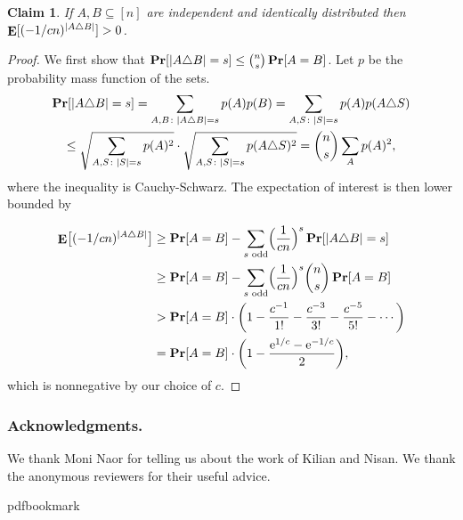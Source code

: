\documentclass[11pt]{article}
\numberwithin{equation}{section}
\newtheorem{claim}[theorem]{Claim}
\theoremstyle{definition}
\theoremstyle{plain}
\newcommand{\eee}{\mathrm e}
\DeclareMathOperator\pr{\mathop{\bf Pr}}
\DeclareMathOperator\E{\mathop{\bf E}}
\providecommand\abs[1]{\lvert#1\rvert}
\begin{document}
\begin{claim}
If $A, B \subseteq [n]$ are independent and identically distributed then $\E[(-1/cn)^{\abs{A \triangle B}}] > 0$.  
\end{claim}
\begin{proof}
We first show that $\pr[\abs{A \triangle B} = s] \leq \binom{n}{s} \pr[A = B]$.  Let $p$ be the probability mass function of the sets.
\begin{multline*}
\pr[\abs{A \triangle B} = s] = \sum_{A, B\colon \abs{A \triangle B} = s} p(A) p(B) 
   = \sum_{A, S\colon \abs{S} = s} p(A) p(A \triangle S)  \\ \leq \sqrt{\sum_{A, S\colon \abs{S} = s} p(A)^2} \cdot \sqrt{\sum_{A, S\colon \abs{S} = s} p(A \triangle S)^2} = \binom{n}{s} \sum_A p(A)^2,
\end{multline*}
where the inequality is Cauchy-Schwarz.  The expectation of interest is then lower bounded by

\begin{align*}
\E\bigl[(-1/cn)^{\abs{A \triangle B}}\bigr] 
   &\geq \pr[A = B] - \sum_{\text{$s$ odd}} \Bigl(\frac{1}{cn}\Bigr)^s \pr[\abs{A \triangle B} = s] \\
   &\geq \pr[A = B] - \sum_{\text{$s$ odd}} \Bigl(\frac{1}{cn}\Bigr)^s \binom{n}{s} \pr[A = B] \\
   &> \pr[A = B] \cdot \biggl(1 - \frac{c^{-1}}{1!} - \frac{c^{-3}}{3!} - \frac{c^{-5}}{5!} - \cdots\biggr) \\
   &= \pr[A = B] \cdot \biggl(1 - \frac{\eee^{1/c} - \eee^{-1/c}}{2}\biggr), 
\end{align*}
which is nonnegative by our choice of $c$.
\end{proof}

%

\subsubsection*{Acknowledgments.}
We thank Moni Naor for telling us about the work of Kilian and Nisan. We thank the anonymous reviewers for their useful advice.



\providecommand{\bibhead}[1]{}
\expandafter\ifx\csname pdfbookmark\endcsname\relax%
  \providecommand{\tocrefpdfbookmark}{}
\else\providecommand{\tocrefpdfbookmark}{%
   \hypertarget{tocreferences}{}%
   \pdfbookmark[1]{References}{tocreferences}}%
\fi
\end{document}
